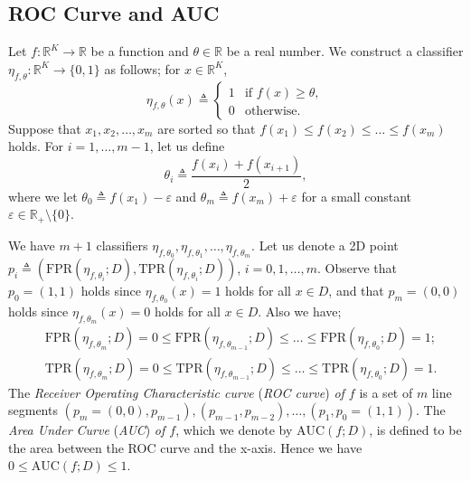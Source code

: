\documentclass[a4paper,12pt,dvipdfmx]{article}
\begin{document}
\subsection{ROC Curve and AUC}
Let $f:\mathbb{R}^K\to\mathbb{R}$ be a function and $\theta\in\mathbb{R}$ be a real number.
We construct a classifier $\eta_{f,\theta}:\mathbb{R}^K\to\{0,1\}$ as follows; for $x\in\mathbb{R}^K$,
\[
\eta_{f,\theta}(x)\triangleq\left\{
\begin{array}{ll}
  1 & \textrm{if\ }f(x)\ge\theta,\\
  0 & \textrm{otherwise}.
\end{array}
\right.
\]
Suppose that $x_1,x_2,\dots,x_m$ are sorted
so that $f(x_1)\le f(x_2)\le\dots\le f(x_m)$ holds. 
For $i=1,\dots,m-1$, let us define
\[
\theta_i\triangleq\frac{f(x_i)+f(x_{i+1})}{2},
\]
where we let $\theta_0\triangleq f(x_1)-\varepsilon$ and
$\theta_m\triangleq f(x_m)+\varepsilon$ for a small constant $\varepsilon\in\mathbb{R}_+\setminus\{0\}$.

We have $m+1$ classifiers $\eta_{f,\theta_0},\eta_{f,\theta_1},\dots,\eta_{f,\theta_m}$. Let us denote a 2D point $p_i\triangleq(\textrm{FPR}(\eta_{f,\theta_i};D),\textrm{TPR}(\eta_{f,\theta_i};D))$, $i=0,1,\dots,m$. 
Observe that $p_0=(1,1)$ holds since $\eta_{f,\theta_0}(x)=1$ holds
for all $x\in D$,  and that
$p_m=(0,0)$ holds since $\eta_{f,\theta_m}(x)=0$ holds
for all $x\in D$.
Also we have;
\begin{align*}
  &\textrm{FPR}(\eta_{f,\theta_m};D)=0\le\textrm{FPR}(\eta_{f,\theta_{m-1}};D) \le\dots\le\textrm{FPR}(\eta_{f,\theta_0};D)=1;\\
  &\textrm{TPR}(\eta_{f,\theta_m};D)=0\le\textrm{TPR}(\eta_{f,\theta_{m-1}};D) \le\dots\le\textrm{TPR}(\eta_{f,\theta_0};D)=1.
\end{align*}
The {\em Receiver Operating Characteristic curve} ({\em ROC curve}) {\em of $f$}
is a set of $m$ line segments $(p_m=(0,0),p_{m-1}),(p_{m-1},p_{m-2}),\dots,(p_1,p_0=(1,1))$.
The {\em Area Under Curve} ({\em AUC}) {\em of $f$},
which we denote by $\textrm{AUC}(f;D)$,
is defined to be the area between the ROC curve and the x-axis.
Hence we have $0\le\textrm{AUC}(f;D)\le1$. 
\end{document}
